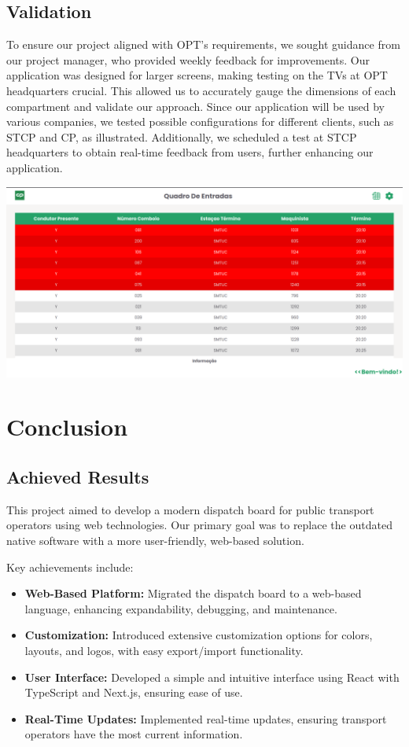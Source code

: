 \documentclass[10pt]{article}
\begin{document}
        
        \subsection{Validation}

        To ensure our project aligned with OPT's requirements, we sought guidance from our project manager, who provided weekly feedback for improvements. Our application was designed for larger screens, making testing on the TVs at OPT headquarters crucial. This allowed us to accurately gauge the dimensions of each compartment and validate our approach. Since our application will be used by various companies, we tested possible configurations for different clients, such as STCP and CP, as illustrated. Additionally, we scheduled a test at STCP headquarters to obtain real-time feedback from users, further enhancing our application.

            \vfill
        \includegraphics[width=1\textwidth]{validation_eg}
            \vfill

        \section{Conclusion}


        \subsection{Achieved Results}
        This project aimed to develop a modern dispatch board for public transport operators using web technologies. Our primary goal was to replace the outdated native software with a more user-friendly, web-based solution. 

        Key achievements include:

        \begin{itemize}
            \item \textbf{Web-Based Platform:} Migrated the dispatch board to a web-based language, enhancing expandability, debugging, and maintenance.
            \item \textbf{Customization:} Introduced extensive customization options for colors, layouts, and logos, with easy export/import functionality.
            \item \textbf{User Interface:} Developed a simple and intuitive interface using React with TypeScript and Next.js, ensuring ease of use.
            \item \textbf{Real-Time Updates:} Implemented real-time updates, ensuring transport operators have the most current information.
        \end{itemize}
\end{document}
